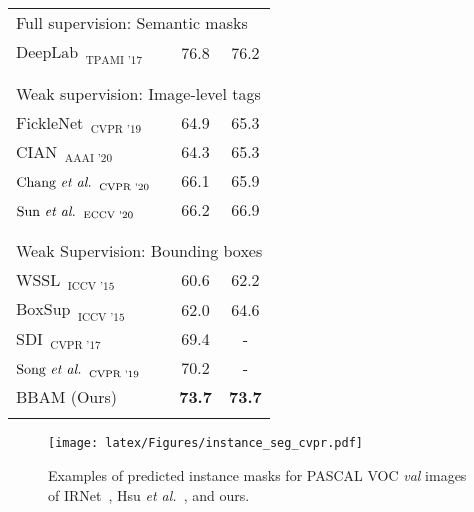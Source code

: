 \documentclass[final]{cvpr}
\begin{document}
\begin{table}[t]
\begin{tabular}{l@{\hskip 1.in}c@{\hskip 0.2in}c}
    \multicolumn{3}{l}{Full supervision: Semantic masks} \\
    $\text{DeepLab}_{\text{~~TPAMI '17}}$~\cite{chen2017deeplab}    & 76.8  & 76.2 \\
    \\[-0.9em]
\hline
    \\[-0.9em]
    \multicolumn{3}{l}{Weak supervision: Image-level tags}\\

    $\text{FickleNet}_{\text{~~CVPR '19}}$~\cite{lee2019ficklenet}   & 64.9 & 65.3\\
    $\text{CIAN}_{\text{~~AAAI '20}}$~\cite{fan2018cian}     & 64.3  & 65.3 \\
    $\text{Chang \textit{et al.}}_{\text{~~CVPR '20}}$~\cite{chang2020weakly}     & 66.1  & 65.9\\
    $\text{Sun \textit{et al.}}_{\text{~~ECCV '20}}$~\cite{sun2020mining}     & 66.2  & 66.9  \\

    \\[-0.9em]
    \hline
    \\[-0.9em]
\multicolumn{3}{l}{Weak Supervision: Bounding boxes}\\
$\text{WSSL}_{\text{~~ICCV '15}}$~\cite{Papandreou_2015_ICCV}  & 60.6   & 62.2 \\
$\text{BoxSup}_{\text{~~ICCV '15}}$~\cite{dai2015boxsup}    & 62.0    & 64.6  \\
    $\text{SDI}_{\text{~~CVPR '17}}$~\cite{khoreva2017simple}    & 69.4  & -  \\
    $\text{Song \textit{et al.}}_{\text{~~CVPR '19}}$~\cite{song2019box}    & 70.2  & - \\
    BBAM (Ours) & \textbf{73.7} & \textbf{73.7}  \\
    \Xhline{1pt}
    \end{tabular}

\vspace{-0.6em}

      \end{table} 

\begin{figure*}[t]
  \centering
  \texttt{[image: latex/Figures/instance\_seg\_cvpr.pdf]} \\[-0.8em]
  \caption{\label{ins_sample} Examples of predicted instance masks for PASCAL VOC \textit{val} images of IRNet~\cite{ahn2019weakly}, Hsu \textit{et al.}~\cite{hsu2019weakly}, and ours.}
  \vspace{-1em}
\end{figure*}
\end{document}
